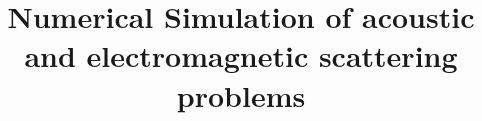 \documentclass[11pt, USenglish, oneside]{book}
\begin{document}
\title{Numerical Simulation of acoustic and electromagnetic scattering problems}
\author{}
\maketitle{}

\frontmatter
\tableofcontents

\mainmatter
{}










%




\backmatter
\cleardoublepage
{}
{}


\end{document}
